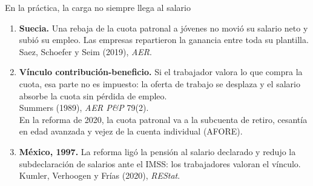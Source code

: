 \documentclass[aspectratio=169,11pt]{beamer}
\begin{document}
\begin{frame}{En la práctica, la carga no siempre llega al salario}
  \small
  \begin{enumerate}
    \item \textbf{Suecia.} Una rebaja de la cuota patronal a jóvenes no movió su salario neto y subió su empleo. Las empresas repartieron la ganancia entre toda su plantilla.\\
      {\color{cGris}Saez, Schoefer y Seim (2019), \emph{AER}.}
    \pause
    \item \textbf{Vínculo contribución-beneficio.} Si el trabajador valora lo que compra la cuota, esa parte no es impuesto: la oferta de trabajo se desplaza y el salario absorbe la cuota sin pérdida de empleo.\\
      {\color{cGris}Summers (1989), \emph{AER P\&P} 79(2).}\\
      En la reforma de 2020, la cuota patronal va a la subcuenta de retiro, cesantía en edad avanzada y vejez de la cuenta individual (AFORE).
    \pause
    \item \textbf{México, 1997.} La reforma ligó la pensión al salario declarado y redujo la subdeclaración de salarios ante el IMSS: los trabajadores valoran el vínculo.\\
      {\color{cGris}Kumler, Verhoogen y Frías (2020), \emph{REStat}.}
  \end{enumerate}
\end{frame}
\end{document}

